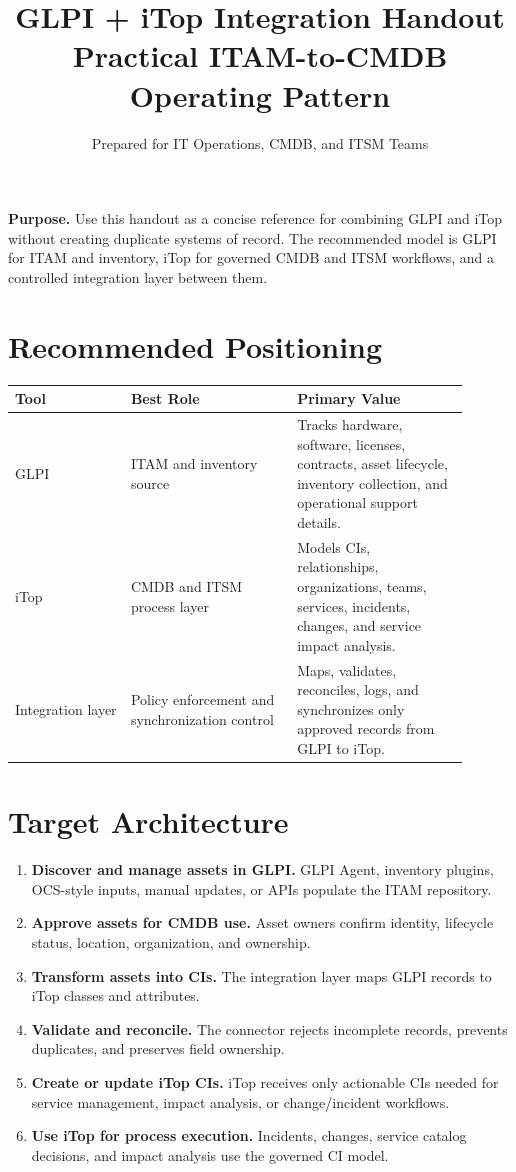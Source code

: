 \documentclass[11pt]{article}
\title{\bfseries\color{Navy} GLPI + iTop Integration Handout\\\large Practical ITAM-to-CMDB Operating Pattern}
\author{Prepared for IT Operations, CMDB, and ITSM Teams}
\date{\docversion}
\begin{document}
\maketitle
\thispagestyle{fancy}

\begin{purposebox}
\textbf{Purpose.} Use this handout as a concise reference for combining GLPI and iTop without creating duplicate systems of record. The recommended model is GLPI for ITAM and inventory, iTop for governed CMDB and ITSM workflows, and a controlled integration layer between them.
\end{purposebox}

\section{Recommended Positioning}

\begin{longtable}{p{0.23\linewidth}p{0.33\linewidth}p{0.34\linewidth}}
\toprule
\rowcolor{LightBlue}\textbf{Tool} & \textbf{Best Role} & \textbf{Primary Value} \\
\midrule
GLPI & ITAM and inventory source & Tracks hardware, software, licenses, contracts, asset lifecycle, inventory collection, and operational support details. \\
iTop & CMDB and ITSM process layer & Models CIs, relationships, organizations, teams, services, incidents, changes, and service impact analysis. \\
Integration layer & Policy enforcement and synchronization control & Maps, validates, reconciles, logs, and synchronizes only approved records from GLPI to iTop. \\
\bottomrule
\end{longtable}

\section{Target Architecture}

\begin{enumerate}
  \item \textbf{Discover and manage assets in GLPI.} GLPI Agent, inventory plugins, OCS-style inputs, manual updates, or APIs populate the ITAM repository.
  \item \textbf{Approve assets for CMDB use.} Asset owners confirm identity, lifecycle status, location, organization, and ownership.
  \item \textbf{Transform assets into CIs.} The integration layer maps GLPI records to iTop classes and attributes.
  \item \textbf{Validate and reconcile.} The connector rejects incomplete records, prevents duplicates, and preserves field ownership.
  \item \textbf{Create or update iTop CIs.} iTop receives only actionable CIs needed for service management, impact analysis, or change/incident workflows.
  \item \textbf{Use iTop for process execution.} Incidents, changes, service catalog decisions, and impact analysis use the governed CI model.
\end{enumerate}
\end{document}
